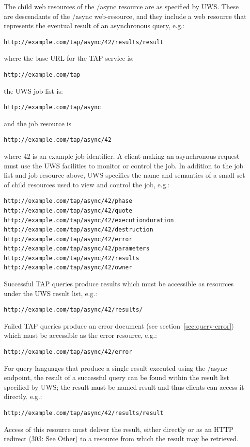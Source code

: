 \documentclass[11pt,letter]{ivoa}
\begin{document}
The child web resources of the /async resource are as specified by UWS. These 
are descendants of the /async web-resource, and they include a web resource that 
represents the eventual result of an asynchronous query, e.g.:
\begin{verbatim}
http://example.com/tap/async/42/results/result
\end{verbatim}
where the base URL for the TAP service is:
\begin{verbatim}
http://example.com/tap
\end{verbatim}
the UWS job list is:
\begin{verbatim}
http://example.com/tap/async
\end{verbatim}
and the job resource is
\begin{verbatim}
http://example.com/tap/async/42
\end{verbatim}
where 42 is an example job identifier. A client making an asynchronous request 
must use 
the UWS facilities to monitor or control the job. In addition to the job list 
and job resource above, UWS specifies the name and semantics of a small set 
of child resources used to view and control the job, e.g.:
\begin{verbatim}
http://example.com/tap/async/42/phase
http://example.com/tap/async/42/quote
http://example.com/tap/async/42/executionduration
http://example.com/tap/async/42/destruction
http://example.com/tap/async/42/error
http://example.com/tap/async/42/parameters
http://example.com/tap/async/42/results
http://example.com/tap/async/42/owner
\end{verbatim}
Successful TAP queries produce results which must be accessible as  resources 
under the UWS result list, e.g.:
\begin{verbatim}
http://example.com/tap/async/42/results/
\end{verbatim}
Failed TAP queries produce an error document (see section~\ref{sec:query-error}) which must be accessible 
as the error resource, e.g.:
\begin{verbatim}
http://example.com/tap/async/42/error
\end{verbatim}
For query languages that produce a single result executed using the /async 
endpoint, the result of a successful query can be found within the result list 
specified by UWS; the result must be named result and thus 
clients can access it directly, e.g.:
\begin{verbatim}
http://example.com/tap/async/42/results/result
\end{verbatim}
Access of this resource must deliver the result, either directly or as an HTTP 
redirect (303: See Other) to a resource from which the result may be retrieved.
\end{document}
